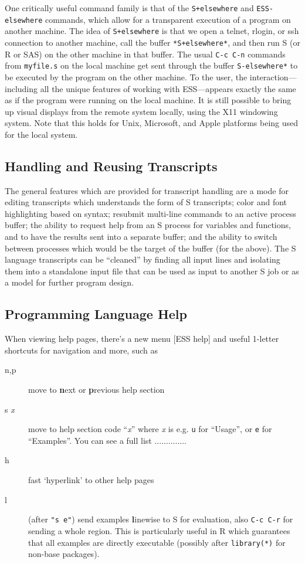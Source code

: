 \documentclass{article}
\begin{document}
One critically useful command family is that of the \verb|S+elsewhere|
and \verb|ESS-elsewhere| commands, which allow for a transparent execution
of a program on another machine.  The idea of 
\verb|S+elsewhere| is that we open a telnet, rlogin, or ssh connection to
another machine, call the buffer \verb|*S+elsewhere*|, and then run S (or R or SAS)
on the other machine in that buffer.
The usual {\tt C-c C-n} commands from {\tt myfile.s} on the local
machine get sent through the buffer {\tt *S-elsewhere*} to be executed
by the program on the other machine.  To the user, the interaction---including
all the unique features of working with ESS---appears exactly the same as if the
program were running on the local machine.
It is still possible to bring up
visual displays from the remote system locally, using the X11
windowing system.  Note that this holds for Unix, Microsoft, and Apple
platforms being used for the local system.

\subsection{Handling and Reusing Transcripts}
\label{sec:S:trans}

The general features which are provided for transcript handling are a
mode for editing transcripts which understands the form of S
transcripts; color and font highlighting based on syntax; resubmit
multi-line commands to an active process buffer; the ability to
request help from an S process for variables and functions, and to
have the results sent into a separate buffer; and the ability to
switch between processes which would be the target of the buffer (for
the above).  The S language transcripts can be ``cleaned'' by
finding all input lines and isolating them into a standalone input file
that can be used as input to another S job or as a model for further
program design.


\subsection{Programming Language Help}
\label{sec:S:help}
When viewing help pages, there's a new menu \textsf{[ESS help]} and
useful 1-letter shortcuts for navigation and more, such as
\begin{description}
\item[n,p] move to \textbf{n}ext or \textbf{p}revious help section
\item[s \textit{x}] move to help section code ``\textit{x}'' where
  \textit{x} is e.g. \texttt{u} for ``Usage'', or \texttt{e} for
  ``Examples''.  You can see a full list ..............
\item[h] fast `hyperlink' to other help pages
\item[l] (after \texttt{"s e"}) send examples \textbf{l}inewise to S for
  evaluation, also \texttt{C-c C-r} for sending a whole region.  This 
  is particularly useful in R which guarantees that all examples are
  directly executable (possibly after \texttt{library(*)} for non-base
  packages).
\end{description}
\end{document}
